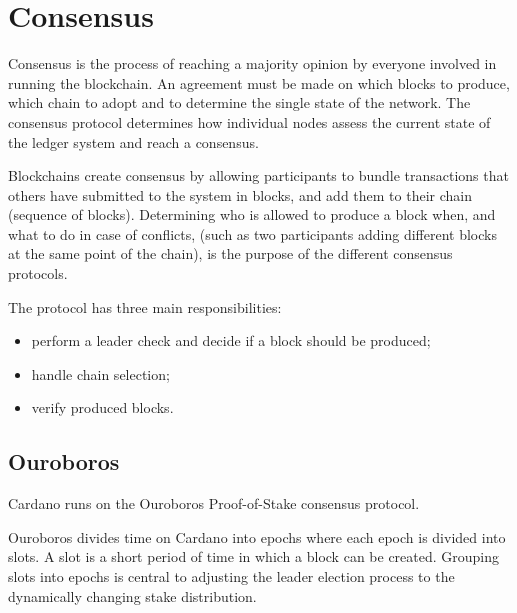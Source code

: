 \chapter{Consensus}

Consensus is the process of reaching a majority opinion by everyone 
involved in running the blockchain. An agreement must be made on which 
blocks to produce, which chain to adopt and to determine the single 
state of the network. The consensus protocol determines how individual 
nodes assess the current state of the ledger system and reach a 
consensus.

\vspace{0.2cm}

\noindent
Blockchains create consensus by allowing participants to bundle 
transactions that others have submitted to the system in blocks, and add 
them to their chain (sequence of blocks). Determining who is allowed to 
produce a block when, and what to do in case of conflicts, (such as two 
participants adding different blocks at the same point of the chain), is 
the purpose of the different consensus protocols.

\vspace{0.2cm}

\noindent
The protocol has three main responsibilities:
\begin{itemize}
    \item perform a leader check and decide if a block should be produced;
    \item handle chain selection;
    \item verify produced blocks.
\end{itemize}

\section{Ouroboros}

Cardano runs on the Ouroboros \gls{Proof-of-Stake} consensus protocol.

\vspace{0.2cm}

\noindent
Ouroboros divides time on Cardano into epochs where each epoch is divided 
into slots. A slot is a short period of time in which a block can be 
created. Grouping slots into epochs is central to adjusting the leader 
election process to the dynamically changing stake distribution.

\vspace{0.2cm}

